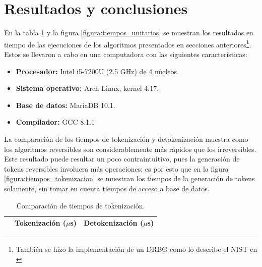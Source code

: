 %
%
%

\section{Resultados y conclusiones}
\label{sec:conclusiones}

En la tabla \ref{tabla:tiempos_tokenizacion} y la figura
\ref{figura:tiempos_unitarios} se muestran los resultados en tiempo de
las ejecuciones de los algoritmos presentados en secciones
anteriores\footnote{También se hizo la implementación de un DRBG como lo
describe el NIST en \cite{nist_aleatorios}}. Estos se llevaron a cabo en una
computadora con las siguientes características:

\begin{itemize}
  \item \textbf{Procesador:} Intel i5-7200U (2.5 GHz) de 4 núcleos.
  \item \textbf{Sistema operativo:} Arch Linux, kernel 4.17.
  \item \textbf{Base de datos:} MariaDB 10.1.
  \item \textbf{Compilador:} GCC 8.1.1
\end{itemize}

La comparación de los tiempos de tokenización y detokenización muestra como los
algoritmos reversibles son considerablemente más rápidos que los irreversibles.
Este resultado puede resultar un poco contraintuitivo, pues la generación de
tokens reversibles involucra más operaciones; es por esto que en la figura
\ref{figura:tiempos_tokenizacion} se muestran los tiempos de la generación de
tokens solamente, sin tomar en cuenta tiempos de acceso a base de datos.


\begin{table}
  \renewcommand{\arraystretch}{1.3}
  \centering
  \caption{Comparación de tiempos de tokenización.}
  \label{tabla:tiempos_tokenizacion}
  \begin{tabular}{c c c}
    \hline
     & Tokenización ($\mu$s) & Detokenización ($\mu$s) \\
    \hline
    
    \hline
  \end{tabular}
\end{table}

